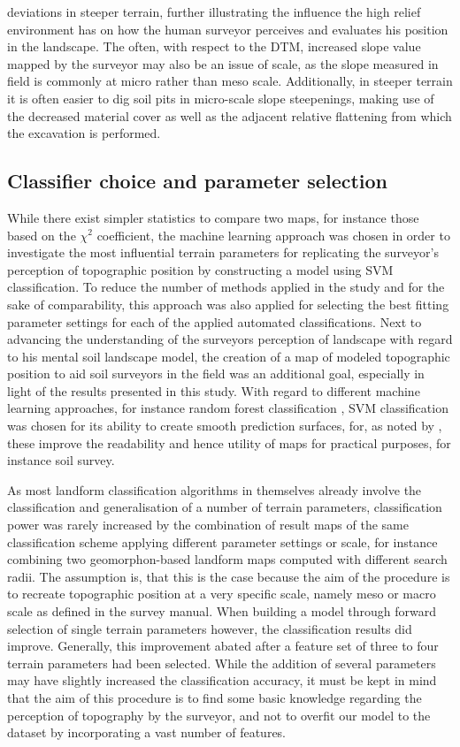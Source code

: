 \documentclass[preprint,12pt,authoryear]{elsarticle}
\begin{document}
deviations in steeper terrain, further illustrating the influence the high relief environment has on how the human surveyor perceives and evaluates his position in the landscape. The often, with respect to the DTM, increased slope value mapped by the surveyor may also be an issue of scale, as the slope measured in field is commonly at micro rather than meso scale. Additionally, in steeper terrain it is often easier to dig soil pits in micro-scale slope steepenings, making use of the decreased material cover as well as the adjacent relative flattening from which the excavation is performed. 

\subsection{Classifier choice and parameter selection}
While there exist simpler statistics to compare two maps, for instance those based on the $\chi^2$ coefficient, the machine learning approach was chosen in order to investigate the most influential terrain parameters for replicating the surveyor's perception of topographic position by constructing a model using  SVM classification. To reduce the number of methods applied in the study and for the sake of comparability, this approach was also applied for selecting the best fitting parameter settings for each of the applied automated classifications. Next to advancing the understanding of the surveyors perception of landscape with regard to his mental soil landscape model, the creation of a map of modeled topographic position to aid soil surveyors in the field was an additional goal, especially in light of the results presented in this study. With regard to different machine learning approaches, for instance random forest classification \citep{Breiman2001}, SVM classification was chosen for its ability to create smooth prediction surfaces, for, as noted by \cite{Steger2016}, these improve the readability and hence utility of maps for practical purposes, for instance soil survey.

As most landform classification algorithms in themselves already involve the classification and generalisation of a number of terrain parameters, classification power was rarely increased by the combination of result maps of the same classification scheme applying different parameter settings or scale, for instance combining two geomorphon-based landform maps computed with different search radii. The assumption is, that this is the case because the aim of the procedure is to recreate topographic position at a very specific scale, namely meso or macro scale as defined in the survey manual. When building a model through forward selection of single terrain parameters however, the classification results did improve. Generally, this improvement abated after a feature set of  three to four terrain parameters had been selected. While the addition of several parameters may have slightly increased the classification accuracy, it must be kept in mind that the aim of this procedure is to find some basic knowledge regarding the perception of topography by the surveyor, and not to overfit our model to the dataset by incorporating a vast number of features.
\end{document}
